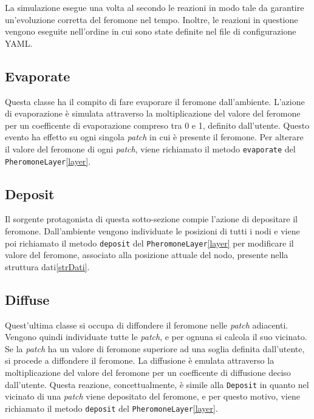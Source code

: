 La simulazione esegue una volta al secondo le reazioni in modo tale da garantire un'evoluzione corretta del feromone nel tempo. Inoltre, le reazioni
in questione vengono eseguite nell'ordine in cui sono state definite nel file di configurazione YAML\@.
\subsection{Evaporate}
Questa classe ha il compito di fare evaporare il feromone dall'ambiente. L'azione di evaporazione è simulata
attraverso la moltiplicazione del valore del feromone per un coefficente di evaporazione compreso tra 0 e 1, 
definito dall'utente. Questo evento ha effetto su ogni singola \textit{patch} in cui è presente il feromone.
Per alterare il valore del feromone di ogni \textit{patch}, viene richiamato il metodo 
\texttt{evaporate} del \texttt{PheromoneLayer}\space\ref{layer}.
\newline


\subsection{Deposit}
Il sorgente protagonista di questa sotto-sezione compie l'azione di depositare il feromone. Dall'ambiente
vengono individuate le posizioni di tutti i nodi e viene poi richiamato il metodo \texttt{deposit} del \texttt{PheromoneLayer}\space\ref{layer}
per modificare il valore del feromone, associato alla posizione attuale del nodo, presente nella struttura dati\space\ref{strDati}.\newline


\subsection{Diffuse}
Quest'ultima classe si occupa di diffondere il feromone nelle \textit{patch} adiacenti. Vengono quindi individuate tutte
le \textit{patch}, e per ognuna si calcola il suo vicinato. Se la \textit{patch} ha un valore di feromone superiore ad una soglia definita dall'utente,
si procede a diffondere il feromone. La diffusione è emulata attraverso la moltiplicazione del valore del feromone
per un coefficente di diffusione deciso dall'utente. Questa reazione, concettualmente, è simile alla \texttt{Deposit} in quanto
nel vicinato di una \textit{patch} viene depositato del feromone, e per questo motivo, viene richiamato il metodo \texttt{deposit} del \texttt{PheromoneLayer}\space\ref{layer}.
\newline


